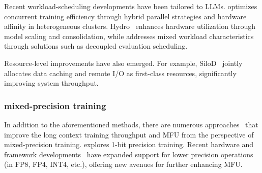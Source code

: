 Recent workload-scheduling developments have been tailored to LLMs. \citet{xue2024codesign} optimizes concurrent training efficiency through hybrid parallel strategies and hardware affinity in heterogeneous clusters. Hydro~\citep{hu2023hydro} enhances hardware utilization through model scaling and consolidation, while \citet{hu2024characterization} addresses mixed workload characteristics through solutions such as decoupled evaluation scheduling.

Resource-level improvements have also emerged. For example, SiloD~\citep{zhao2023silod} jointly allocates data caching and remote I/O as first-class resources, significantly improving system throughput. 

\subsubsection*{mixed-precision training}
In addition to the aforementioned methods, there are numerous approaches~\citep{narang2017mixed, kalamkar2019study, sun2019hybrid, dubey2024llama, qwen2024qwen25technicalreport, Deepseek2024DeepSeek-V3} that improve the long context training throughput and MFU from the perspective of mixed-precision training. \citet{wang2023bitnet} explores 1-bit precision training. Recent hardware and framework developments~\citep{xi2024jetfire, xi2023training, jacobs2023deepspeed, Shoeybi2019MegatronLMTM, Bian2021ColossalAIAU, peng2023fp8, torchtitan, meta_lingua, NVIDIA2024Transformer_Engine} have expanded support for lower precision operations (in FP8, FP4, INT4, etc.), offering new avenues for further enhancing MFU.
